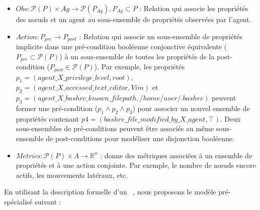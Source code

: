\begin{itemize}
  \item $Obs : \mathcal{P}(P) \times Ag \rightarrow \mathcal{P}(P_{Ag}), P_{Ag} \subset P$ : Relation qui associe les propriétés des nœuds et un agent au sous-ensemble de propriétés observées par l'agent.



  \item $Action : P_{pre} \rightarrow P_{post}$ : Relation qui associe un sous-ensemble de propriétés implicite dans une pré-condition booléenne conjonctive équivalente ($P_{pre} \subset \mathcal{P}(P)$) à un sous-ensemble de toutes les propriétés de la post-condition ($P_{post} \in \mathcal{P}(P)$). Par exemple, les propriétés $p_1 = (agent\_X\_privilege\_level, \allowbreak root)$, $p_2 = (agent\_X\_accessed\_text\_editor, \allowbreak Vim)$ et $p_3 = (agent\_X\_bashrc\_known\_filepath, \allowbreak /home/user/.bashrc)$ peuvent former une pré-condition ($p_1 \land p_2 \land p_3$) pour associer un nouvel ensemble de propriétés contenant $p4 = (bashrc\_file\_modified\_by\_X\_agent, \top)$. Deux sous-ensembles de pré-conditions peuvent être associés au même sous-ensemble de post-conditions pour modéliser une disjonction booléenne.

  \item $Metrics: \mathcal{P}(P) \times A \rightarrow \mathbb{R}^{n}$ : donne des métriques associées à un ensemble de propriétés et à une action conjointe. Par exemple, le nombre de nœuds encore actifs, les mouvements latéraux, etc.

\end{itemize}


En utilisant la description formelle d'un ~\cite{Oliehoek2016}, nous proposons le modèle  pré-spécialisé suivant :

